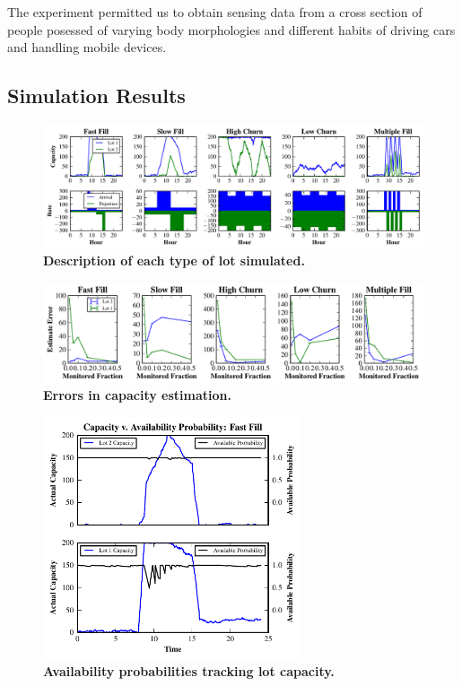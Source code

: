 The experiment permitted us to obtain sensing data from a cross section of
people posessed of varying body morphologies and different habits of driving
cars and handling mobile devices.

\subsection{Simulation Results}

\begin{figure}
\centering
\includegraphics[width=\textwidth]{./simulator/figures/lots.pdf}

\caption{\textbf{Description of each type of lot simulated.} }

\label{fig-lotsdescription}
\end{figure}

\begin{figure}
\centering
\includegraphics[width=\textwidth]{./simulator/figures/capacity_experiment.pdf}

\caption{\textbf{Errors in capacity estimation.} }

\label{fig-capacityerrors}
\end{figure}

\begin{figure}
\centering
\includegraphics[width=3.0in]{./simulator/figures/tracking_fastfill.pdf}

\caption{\textbf{Availability probabilities tracking lot capacity.} }

\label{fig-trackingexample}
\end{figure}


